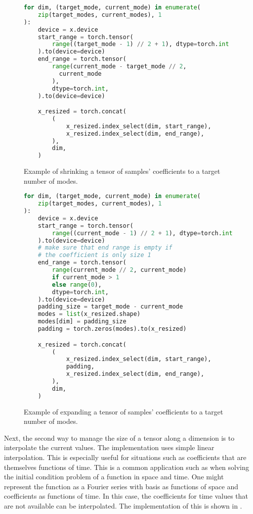 \begin{figure}[H]
  \centering
  \begin{lstlisting}[language=Python]
for dim, (target_mode, current_mode) in enumerate(
    zip(target_modes, current_modes), 1
):
    device = x.device
    start_range = torch.tensor(
        range((target_mode - 1) // 2 + 1), dtype=torch.int
    ).to(device=device)
    end_range = torch.tensor(
        range(current_mode - target_mode // 2,
          current_mode
        ),
        dtype=torch.int,
    ).to(device=device)

    x_resized = torch.concat(
        (
            x_resized.index_select(dim, start_range),
            x_resized.index_select(dim, end_range),
        ),
        dim,
    )
  \end{lstlisting}
  \caption{Example of shrinking a tensor of samples' coefficients to a target number of modes.}\label{fig:coefficient_shrink_impl}
\end{figure}
\begin{figure}[H]
  \centering
  \begin{lstlisting}[language=Python]
for dim, (target_mode, current_mode) in enumerate(
    zip(target_modes, current_modes), 1
):
    device = x.device
    start_range = torch.tensor(
        range((current_mode - 1) // 2 + 1), dtype=torch.int
    ).to(device=device)
    # make sure that end range is empty if
    # the coefficient is only size 1
    end_range = torch.tensor(
        range(current_mode // 2, current_mode)
        if current_mode > 1
        else range(0),
        dtype=torch.int,
    ).to(device=device)
    padding_size = target_mode - current_mode
    modes = list(x_resized.shape)
    modes[dim] = padding_size
    padding = torch.zeros(modes).to(x_resized)

    x_resized = torch.concat(
        (
            x_resized.index_select(dim, start_range),
            padding,
            x_resized.index_select(dim, end_range),
        ),
        dim,
    )
  \end{lstlisting}
  \caption{Example of expanding a tensor of samples' coefficients to a target number of modes.}\label{fig:coefficient_expand_impl}
\end{figure}
Next, the second way to manage the size of a tensor along a dimension is to interpolate the current values. The implementation uses simple linear interpolation. This is especially useful for situations such as coefficients that are themselves functions of time. This is a common application such as when solving the initial condition problem of a function in space and time. One might represent the function as a Fourier series with basis as functions of space and coefficients as functions of time. In this case, the coefficients for time values that are not available can be interpolated. The implementation of this is shown in .
